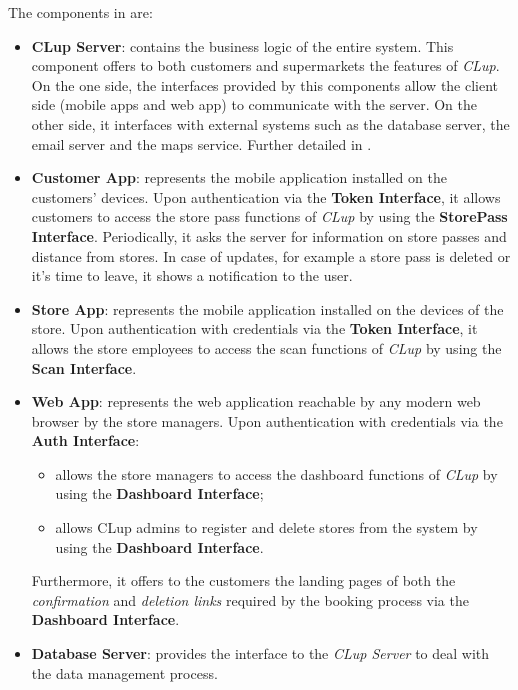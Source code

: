 The components in  are:
\begin{itemize}
	\item \textbf{CLup Server}: contains the business logic of the entire system. This component offers to both customers and supermarkets the features of \textit{CLup}. On the one side, the interfaces provided by this components allow the client side (mobile apps and web app) to communicate with the server. On the other side, it interfaces with external systems such as the database server, the email server and the maps service. Further detailed in .
	
	\item \textbf{Customer App}: represents the mobile application installed on the customers' devices. Upon authentication via the \textbf{Token Interface}, it allows customers to access the store pass functions of \textit{CLup} by using the \textbf{StorePass Interface}. Periodically, it asks the server for information on store passes and distance from stores. In case of updates, for example a store pass is deleted or it's time to leave, it shows a notification to the user.
	
	\item \textbf{Store App}: represents the mobile application	installed on the devices of the store. Upon authentication with credentials via the \textbf{Token Interface}, it allows the store employees to access the scan functions of \textit{CLup} by using the \textbf{Scan Interface}.
	
	\item \textbf{Web App}: represents the web application reachable by any modern web browser by the store managers. Upon authentication with credentials via the \textbf{Auth Interface}:
	\begin{itemize}
		\item allows the store managers to access the dashboard functions of \textit{CLup} by using the \textbf{Dashboard Interface};
		\item allows CLup admins to register and delete stores from the system by using the \textbf{Dashboard Interface}.
	\end{itemize}
	Furthermore, it offers to the customers the landing pages of both the \textit{confirmation} and \textit{deletion links} required by the booking process via the \textbf{Dashboard Interface}.
	
	\item \textbf{Database Server}:	provides the interface to the \textit{CLup Server} to deal with the data management process. 
	

\end{itemize}

